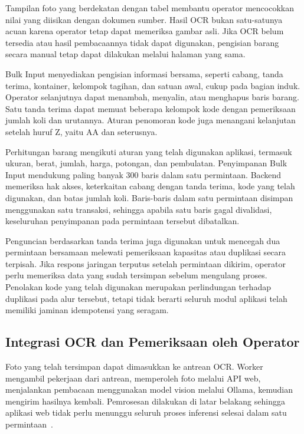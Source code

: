 Tampilan foto yang berdekatan dengan tabel membantu operator mencocokkan nilai yang diisikan dengan dokumen sumber. Hasil OCR bukan satu-satunya acuan karena operator tetap dapat memeriksa gambar asli. Jika OCR belum tersedia atau hasil pembacaannya tidak dapat digunakan, pengisian barang secara manual tetap dapat dilakukan melalui halaman yang sama.

Bulk Input menyediakan pengisian informasi bersama, seperti cabang, tanda terima, kontainer, kelompok tagihan, dan satuan awal, cukup pada bagian induk. Operator selanjutnya dapat menambah, menyalin, atau menghapus baris barang. Satu tanda terima dapat memuat beberapa kelompok kode dengan pemeriksaan jumlah koli dan urutannya. Aturan penomoran kode juga menangani kelanjutan setelah huruf Z, yaitu AA dan seterusnya.

Perhitungan barang mengikuti aturan yang telah digunakan aplikasi, termasuk ukuran, berat, jumlah, harga, potongan, dan pembulatan. Penyimpanan Bulk Input mendukung paling banyak 300 baris dalam satu permintaan. Backend memeriksa hak akses, keterkaitan cabang dengan tanda terima, kode yang telah digunakan, dan batas jumlah koli. Baris-baris dalam satu permintaan disimpan menggunakan satu transaksi, sehingga apabila satu baris gagal divalidasi, keseluruhan penyimpanan pada permintaan tersebut dibatalkan.

Penguncian berdasarkan tanda terima juga digunakan untuk mencegah dua permintaan bersamaan melewati pemeriksaan kapasitas atau duplikasi secara terpisah. Jika respons jaringan terputus setelah permintaan dikirim, operator perlu memeriksa data yang sudah tersimpan sebelum mengulang proses. Penolakan kode yang telah digunakan merupakan perlindungan terhadap duplikasi pada alur tersebut, tetapi tidak berarti seluruh modul aplikasi telah memiliki jaminan idempotensi yang seragam.

\subsection{Integrasi OCR dan Pemeriksaan oleh Operator}

Foto yang telah tersimpan dapat dimasukkan ke antrean OCR. Worker mengambil pekerjaan dari antrean, memperoleh foto melalui API web, menjalankan pembacaan menggunakan model vision melalui Ollama, kemudian mengirim hasilnya kembali. Pemrosesan dilakukan di latar belakang sehingga aplikasi web tidak perlu menunggu seluruh proses inferensi selesai dalam satu permintaan~\cite{ollama_vision, matrans_ocr}.

